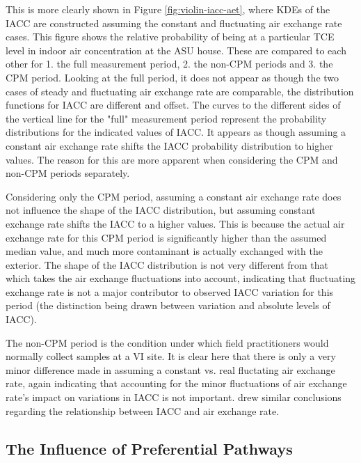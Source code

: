 \documentclass[journal=esthag,manuscript=article]{achemso}
\begin{document}
This is more clearly shown in Figure \ref{fig:violin-iacc-aet}, where KDEs of the IACC are constructed assuming the constant and fluctuating air exchange rate cases.
This figure shows the relative probability of being at a particular TCE level in indoor air concentration at the ASU house.
These are compared to each other for 1. the full measurement period, 2. the non-CPM periods and 3. the CPM period.
Looking at the full period, it does not appear as though the two cases of steady and fluctuating air exchange rate are comparable, the distribution functions for IACC are different and offset.
The curves to the different sides of the vertical line for the "full" measurement period represent the probability distributions for the indicated values of IACC.
It appears as though assuming a constant air exchange rate shifts the IACC probability distribution to higher values.
The reason for this are more apparent when considering the CPM and non-CPM periods separately.

Considering only the CPM period, assuming a constant air exchange rate does not influence the shape of the IACC distribution, but assuming constant exchange rate shifts the IACC to a higher values.
This is because the actual air exchange rate for this CPM period is significantly higher than the assumed median value, and much more contaminant is actually exchanged with the exterior.
The shape of the IACC distribution is not very different from that which takes the air exchange fluctuations into account, indicating that fluctuating exchange rate is not a major contributor to observed IACC variation for this period (the distinction being drawn between variation and absolute levels of IACC).

The non-CPM period is the condition under which field practitioners would normally collect samples at a VI site.
It is clear here that there is only a very minor difference made in assuming a constant vs. real fluctating air exchange rate, again indicating that accounting for the minor fluctuations of air exchange rate's impact on variations in IACC is not important.
\citeauthor{rackes_time-averaged_2016}\cite{rackes_time-averaged_2016} drew similar conclusions regarding the relationship between IACC and air exchange rate.

\subsection{The Influence of Preferential Pathways}

\end{document}
